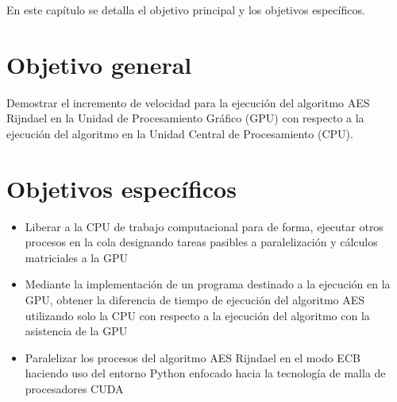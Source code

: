 \documentclass[../main/main.tex]{subfiles}
\begin{document}
\espacio

  En este capítulo se detalla el objetivo principal y los objetivos específicos.

  \section{Objetivo general}

  Demostrar el incremento de velocidad para la ejecución del algoritmo AES Rijndael en la Unidad de Procesamiento Gráfico (GPU) con respecto a la ejecución del algoritmo en la Unidad Central de Procesamiento (CPU).

  \section{Objetivos específicos}

  \begin{itemize}
    \item Liberar a la CPU de trabajo computacional para de forma, ejecutar otros procesos en la cola designando tareas pasibles a paralelización y cálculos matriciales a la GPU
    \item Mediante la implementación de un programa destinado a la ejecución en la GPU, obtener la diferencia de tiempo de ejecución del algoritmo AES utilizando solo la CPU con respecto a la ejecución del algoritmo con la asistencia de la GPU
    \item Paralelizar los procesos del algoritmo AES Rijndael en el modo ECB haciendo uso del entorno Python enfocado hacia la tecnología de malla de procesadores CUDA
  \end{itemize}
\end{document}
